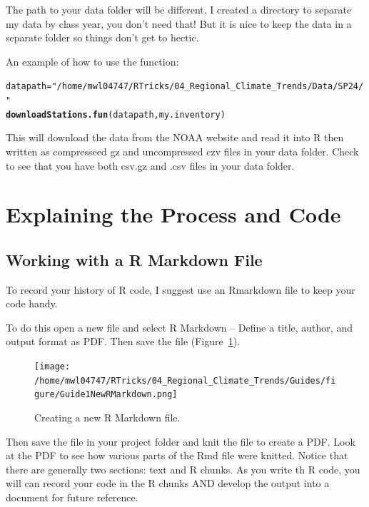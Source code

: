 \documentclass{article}\usepackage[]{graphicx}\usepackage[dvipsnames]{xcolor}
\makeatletter
\newcommand{\hlstr}[1]{\textcolor[rgb]{0.192,0.494,0.8}{#1}}%
\newcommand{\hlstd}[1]{\textcolor[rgb]{0.345,0.345,0.345}{#1}}%
\newcommand{\hlkwb}[1]{\textcolor[rgb]{0.69,0.353,0.396}{#1}}%
\newcommand{\hlkwd}[1]{\textcolor[rgb]{0.737,0.353,0.396}{\textbf{#1}}}%
\newenvironment{kframe}{%
 \def\at@end@of@kframe{}%
 \ifinner\ifhmode%
  \def\at@end@of@kframe{\end{minipage}}%
  \begin{minipage}{\columnwidth}%
 \fi\fi%
 \def\FrameCommand##1{\hskip\@totalleftmargin \hskip-\fboxsep
 \colorbox{shadecolor}{##1}\hskip-\fboxsep
     \hskip-\linewidth \hskip-\@totalleftmargin \hskip\columnwidth}%
 \MakeFramed {\advance\hsize-\width
   \@totalleftmargin\z@ \linewidth\hsize
   \@setminipage}}%
 {\par\unskip\endMakeFramed%
 \at@end@of@kframe}
\newenvironment{knitrout}{}{} %
\makeatother
\begin{document}
\begin{description}
The path to your data folder will be different, I created a directory to separate my data by class year, you don't need that! But it is nice to keep the data in a separate folder so things don't get to hectic.

An example of how to use the function: 

\begin{knitrout}
\color{fgcolor}\begin{kframe}
\begin{alltt}
\hlstd{datapath} \hlkwb{=} \hlstr{"/home/mwl04747/RTricks/04_Regional_Climate_Trends/Data/SP24/"}
\hlkwd{downloadStations.fun}\hlstd{(datapath, my.inventory)}
\end{alltt}
\end{kframe}
\end{knitrout}

This will download the data from the NOAA website and read it into R then written as compresseed gz and uncompressed czv files in your data folder. Check to see that you have both csv.gz and .csv files in your data folder.

\end{description}

\noindent {\Large\textcolor{ForestGreen}{You're are done with this guide, go to Guide 2!}}

\section{Explaining the Process and Code}

\subsection{Working with a R Markdown File}\label{subsec:RMarkdown}

To record your history of R code, I suggest use an Rmarkdown file to keep your code handy. 

To do this open a new file and select R Markdown -- Define a title, author, and output format as PDF. Then save the file (Figure~\ref{fig:RMarkdown}). 

\begin{figure}[h]
\centering
\texttt{[image: /home/mwl04747/RTricks/04\_Regional\_Climate\_Trends/Guides/figure/Guide1NewRMarkdown.png]}
\caption{Creating a new R Markdown file.}
\label{fig:RMarkdown}
\end{figure}


Then save the file in your project folder and knit the file to create a PDF. Look at the PDF to see how various parts of the Rmd file were knitted. Notice that there are generally two sections: text and R chunks. As you write th R code, you will can record your code in the R chunks AND develop the output into a document for future reference.
\end{document}
